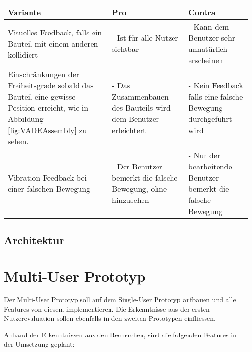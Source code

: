 \begin{center}
	\begin{tabularx} {\textwidth} { |X|X|X| }
		\hline
		\rowcolor{black}
		\color{white} \textbf{Variante} & \color{white} \textbf{Pro} & 
		\color{white} \textbf{Contra} \\
		\hline
		Visuelles Feedback, falls ein Bauteil mit einem anderen kollidiert & - Ist für alle Nutzer sichtbar & - Kann dem Benutzer sehr unnatürlich erscheinen \\
		\hline
		Einschränkungen der Freiheitsgrade sobald das Bauteil eine gewisse Position erreicht, wie in Abbildung \ref{fig:VADEAssembly} zu sehen. & - Das Zusammenbauen des Bauteils wird dem Benutzer erleichtert & - Kein Feedback falls eine falsche Bewegung durchgeführt wird \\
		\hline
		Vibration Feedback bei einer falschen Bewegung & - Der Benutzer bemerkt die falsche Bewegung, ohne hinzusehen & - Nur der bearbeitende Benutzer bemerkt die falsche Bewegung \\
		\hline	
	\end{tabularx}
\end{center}
\label{tbl:varianten_zusammenbau}

\subsection{Architektur}

\pagebreak
\section{Multi-User Prototyp}
Der Multi-User Prototyp soll auf dem Single-User Prototyp aufbauen und alle Features von diesem implementieren. Die Erkenntnisse aus der ersten Nutzerevaluation sollen ebenfalls in den zweiten Prototypen einfliessen.

Anhand der Erkenntnissen aus den Recherchen, sind die folgenden Features in der Umsetzung geplant:

